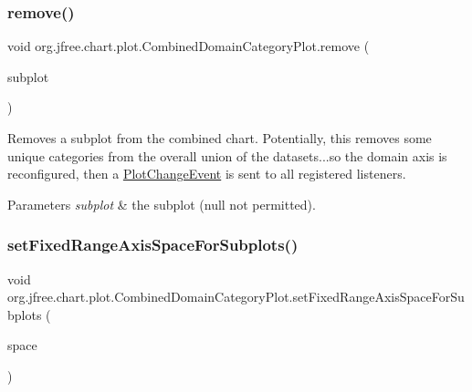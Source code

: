 \subsubsection{\texorpdfstring{remove()}{remove()}}
{\footnotesize\ttfamily void org.\+jfree.\+chart.\+plot.\+Combined\+Domain\+Category\+Plot.\+remove (\begin{DoxyParamCaption}\item[{\mbox{\hyperlink{classorg_1_1jfree_1_1chart_1_1plot_1_1_category_plot}{Category\+Plot}}}]{subplot }\end{DoxyParamCaption})}

Removes a subplot from the combined chart. Potentially, this removes some unique categories from the overall union of the datasets...so the domain axis is reconfigured, then a \mbox{\hyperlink{}{Plot\+Change\+Event}} is sent to all registered listeners.


\begin{DoxyParams}{Parameters}
{\em subplot} & the subplot ({\ttfamily null} not permitted). \\
\hline
\end{DoxyParams}
\mbox{\label{classorg_1_1jfree_1_1chart_1_1plot_1_1_combined_domain_category_plot_a6675c4d67418b1b6a5b361ac8279333c}} 
\subsubsection{\texorpdfstring{set\+Fixed\+Range\+Axis\+Space\+For\+Subplots()}{setFixedRangeAxisSpaceForSubplots()}}
{\footnotesize\ttfamily void org.\+jfree.\+chart.\+plot.\+Combined\+Domain\+Category\+Plot.\+set\+Fixed\+Range\+Axis\+Space\+For\+Subplots (\begin{DoxyParamCaption}\item[{\mbox{\hyperlink{classorg_1_1jfree_1_1chart_1_1axis_1_1_axis_space}{Axis\+Space}}}]{space }\end{DoxyParamCaption})\hspace{0.3cm}{\ttfamily [protected]}}


